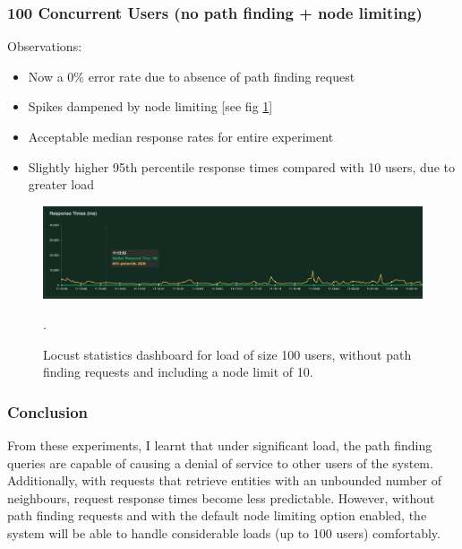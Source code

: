 \subsubsection{100 Concurrent Users (no path finding + node limiting)}
Observations:
\begin{itemize}
    \item Now a 0\% error rate due to absence of path finding request
    \item Spikes dampened by node limiting [see fig \ref{fig:100-users-no-path-with-limit}]
    \item Acceptable median response rates for entire experiment
    \item Slightly higher 95th percentile response times compared with 10 users, due to greater load
\end{itemize}

\begin{figure}[h!]
  \centering
  \includegraphics[width = 15cm]{./figures/100-users-no-path-node-limit}\\[0.5cm]
  \caption{Locust statistics dashboard for load of size 100 users, without path finding requests and including a node limit of 10.}.
  \label{fig:100-users-no-path-with-limit}
\end{figure}

\subsubsection{Conclusion}
From these experiments, I learnt that under significant load, the path finding queries are capable of causing a denial of service to other users of the system. Additionally, with requests that retrieve entities with an unbounded number of neighbours, request response times become less predictable. However, without path finding requests and with the default node limiting option enabled, the system will be able to handle considerable loads (up to 100 users) comfortably. 

